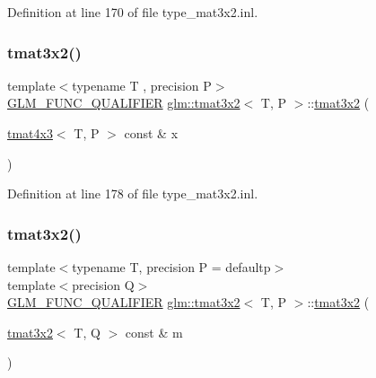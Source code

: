 Definition at line 170 of file type\+\_\+mat3x2.\+inl.

\mbox{\label{structglm_1_1tmat3x2_ac101d14687670dd6916a9e5c161efdf1}} 
\subsubsection{\texorpdfstring{tmat3x2()}{tmat3x2()}\hspace{0.1cm}{\footnotesize\ttfamily [18/22]}}
{\footnotesize\ttfamily template$<$typename T , precision P$>$ \\
\mbox{\hyperlink{setup_8hpp_a33fdea6f91c5f834105f7415e2a64407}{G\+L\+M\+\_\+\+F\+U\+N\+C\+\_\+\+Q\+U\+A\+L\+I\+F\+I\+ER}} \mbox{\hyperlink{structglm_1_1tmat3x2}{glm\+::tmat3x2}}$<$ T, P $>$\+::\mbox{\hyperlink{structglm_1_1tmat3x2}{tmat3x2}} (\begin{DoxyParamCaption}\item[{\mbox{\hyperlink{structglm_1_1tmat4x3}{tmat4x3}}$<$ T, P $>$ const \&}]{x }\end{DoxyParamCaption})}



Definition at line 178 of file type\+\_\+mat3x2.\+inl.

\mbox{\label{structglm_1_1tmat3x2_a5c9661d554c44cfa3db4ca95c5fd553a}} 
\subsubsection{\texorpdfstring{tmat3x2()}{tmat3x2()}\hspace{0.1cm}{\footnotesize\ttfamily [19/22]}}
{\footnotesize\ttfamily template$<$typename T, precision P = defaultp$>$ \\
template$<$precision Q$>$ \\
\mbox{\hyperlink{setup_8hpp_a33fdea6f91c5f834105f7415e2a64407}{G\+L\+M\+\_\+\+F\+U\+N\+C\+\_\+\+Q\+U\+A\+L\+I\+F\+I\+ER}} \mbox{\hyperlink{structglm_1_1tmat3x2}{glm\+::tmat3x2}}$<$ T, P $>$\+::\mbox{\hyperlink{structglm_1_1tmat3x2}{tmat3x2}} (\begin{DoxyParamCaption}\item[{\mbox{\hyperlink{structglm_1_1tmat3x2}{tmat3x2}}$<$ T, Q $>$ const \&}]{m }\end{DoxyParamCaption})}



